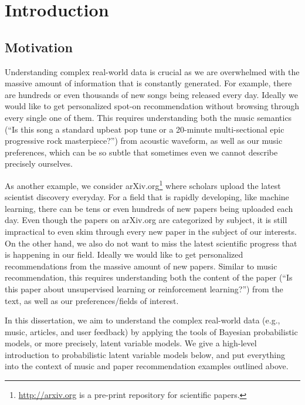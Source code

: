 
\chapter{Introduction}\label{chpt:intro}

\section{Motivation}\label{chpt:intro:sec:motivation}

Understanding complex real-world data is crucial as we are overwhelmed with the massive amount of information that is constantly generated. For example, there are hundreds or even thousands of new songs being released every day. Ideally we would like to get personalized spot-on recommendation without browsing through every single one of them. This requires understanding both the music semantics (``Is this song a standard upbeat pop tune or a 20-minute multi-sectional epic progressive rock masterpiece?'') from acoustic waveform, as well as our music preferences, which can be so subtle that sometimes even we cannot describe precisely ourselves.  

As another example, we consider arXiv.org\footnote{\url{http://arxiv.org} is a pre-print repository
for scientific papers.} where scholars upload the latest scientist discovery everyday. For a field that is rapidly developing, like machine learning, there can be tens or even hundreds of new papers being uploaded each day. Even though the papers on arXiv.org are categorized by subject, it is still impractical to even skim through every new paper in the subject of our interests. On the other hand, we also do not want to miss the latest scientific progress that is happening in our field. Ideally we would like to get personalized recommendations from the massive amount of new papers. Similar to music recommendation, this requires understanding both the content of the paper (``Is this paper about unsupervised learning or reinforcement learning?'') from the text, as well as our preferences/fields of interest. 

In this dissertation, we aim to understand the complex real-world data (e.g., music, articles, and user feedback) by applying the tools of Bayesian probabilistic models, or more precisely, latent variable models. We give a high-level introduction to probabilistic latent variable models below, and put everything into the context of music and paper recommendation examples outlined above. 

